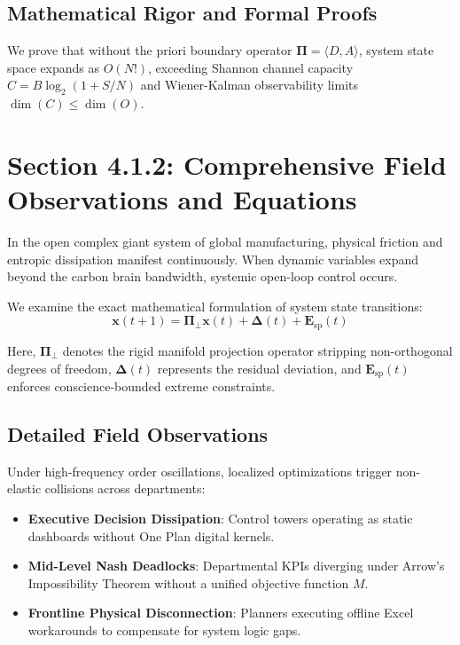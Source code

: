\documentclass[12pt,a4paper,oneside]{book}
\begin{document}
\subsection*{Mathematical Rigor and Formal Proofs}
We prove that without the priori boundary operator $\mathbf{\Pi} = \langle D, A \rangle$, system state space expands as $O(N!)$, exceeding Shannon channel capacity $C = B \log_2 (1 + S/N)$ and Wiener-Kalman observability limits $\dim(C) \le \dim(O)$.
\clearpage
\section{Section 4.1.2: Comprehensive Field Observations and Equations}

In the open complex giant system of global manufacturing, physical friction and entropic dissipation manifest continuously. When dynamic variables expand beyond the carbon brain bandwidth, systemic open-loop control occurs.

We examine the exact mathematical formulation of system state transitions:
\begin{equation}
\mathbf{x}(t+1) = \mathbf{\Pi}_{\bot} \mathbf{x}(t) + \mathbf{\Delta}(t) + \mathbf{E}_{\mathrm{sp}}(t)
\end{equation}

Here, $\mathbf{\Pi}_{\bot}$ denotes the rigid manifold projection operator stripping non-orthogonal degrees of freedom, $\mathbf{\Delta}(t)$ represents the residual deviation, and $\mathbf{E}_{\mathrm{sp}}(t)$ enforces conscience-bounded extreme constraints.

\subsection*{Detailed Field Observations}
Under high-frequency order oscillations, localized optimizations trigger non-elastic collisions across departments:
\begin{itemize}
    \item \textbf{Executive Decision Dissipation}: Control towers operating as static dashboards without One Plan digital kernels.
    \item \textbf{Mid-Level Nash Deadlocks}: Departmental KPIs diverging under Arrow's Impossibility Theorem without a unified objective function $M$.
    \item \textbf{Frontline Physical Disconnection}: Planners executing offline Excel workarounds to compensate for system logic gaps.
\end{itemize}
\end{document}
